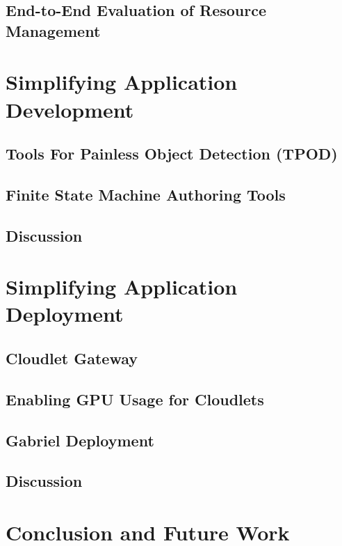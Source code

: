 \documentclass[12pt,openany]{cmuthesis}
\begin{document}
\subsection{End-to-End Evaluation of Resource Management}

\section{Simplifying Application Development}
\subsection{Tools For Painless Object Detection (TPOD)}
\subsection{Finite State Machine Authoring Tools}
\subsection{Discussion}

\section{Simplifying Application Deployment}
\subsection{Cloudlet Gateway}
\subsection{Enabling GPU Usage for Cloudlets}
\subsection{Gabriel Deployment}
\subsection{Discussion}

\section{Conclusion and Future Work}

% 
% 
% 
% 
% 
% 
% 
% 
%
\end{document}
